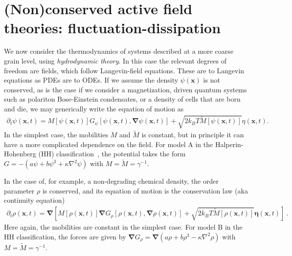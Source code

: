 \section{(Non)conserved active field theories: fluctuation-dissipation}



We now consider the thermodynamics of systems described at a more coarse grain level, using \emph{hydrodynamic theory}. 
In this case the relevant degrees of freedom are fields, which follow Langevin-field equations.
These are to Langevin equations as PDEs are to ODEs.
If we assume the density $\psi(\bm x)$ is not conserved, as is the case if we consider a magnetization, driven quantum systems such as polariton Bose-Einstein condensates, or a density of cells that are born and die, we may generically write the equation of motion as
%
\begin{align}
    \partial_t \psi(\bm x, t) 
    = M[\psi(\bm x, t)] G_\psi[\psi(\bm x, t), \bm \nabla \psi(\bm x, t)] 
    + \sqrt{ 2 k_B T \tilde M[\psi(\bm x, t)] } \eta(\bm x, t).
\end{align}
%
In the simplest case, the mobilities $M$ and $\tilde{M}$ is constant, but in principle it can have a more complicated dependence on the field.
For model A in the Halperin-Hohenberg (HH) classification~\cite{HohenbergRMP}, the potential takes the form $G = -(a \psi + b \psi^3 + \kappa \nabla^2 \psi)$ with $M=\tilde{M}=\gamma^{-1}$. 
%

In the case of, for example, a non-degrading chemical density, the order parameter $\rho$ is conserved, and its equation of motion is the conservation law (aka continuity equation)
%
\begin{align}
    \partial_t \rho(\bm x, t)
    = 
    \bm \nabla
    \left[
        M[\rho(\bm x, t)]
        \bm \nabla G_\rho[\rho(\bm x, t), \bm \nabla\rho(\bm x, t)]
        + \sqrt{ 2 k_B T \tilde M[\rho(\bm x, t)] }
        \bm \eta(\bm x, t)
    \right]~.
\end{align}
%
Here again, the mobilities are constant in the simplest case.
For model B in the HH classification, the forces are given by $\bm \nabla G_\rho = \bm \nabla (a \rho + b \rho^3 - \kappa \nabla^2 \rho)$ with $M = \tilde{M} = \gamma^{-1}$.

